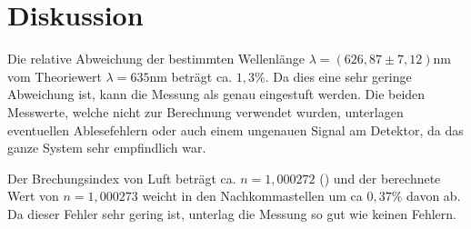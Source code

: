 \section{Diskussion}
\label{sec:Diskussion}

Die relative Abweichung der bestimmten Wellenlänge $\lambda =  (626,87 \pm 7,12) \si{\nano\meter}$ vom Theoriewert $\lambda = 635 \si{\nano\meter}$ beträgt ca. $1,3 \%$.
Da dies eine sehr geringe Abweichung ist, kann die Messung als genau eingestuft werden. Die beiden Messwerte, welche nicht zur Berechnung verwendet wurden, unterlagen eventuellen Ablesefehlern oder auch einem ungenauen Signal am Detektor, da das ganze System sehr empfindlich war.

\noindent Der Brechungsindex von Luft beträgt ca. $n = 1,000272$ (\cite{sample1}) und der berechnete Wert von $n = 1,000273$ weicht in den Nachkommastellen um ca $0,37 \%$ davon ab. Da dieser Fehler sehr gering ist, unterlag die Messung so gut wie keinen Fehlern.
